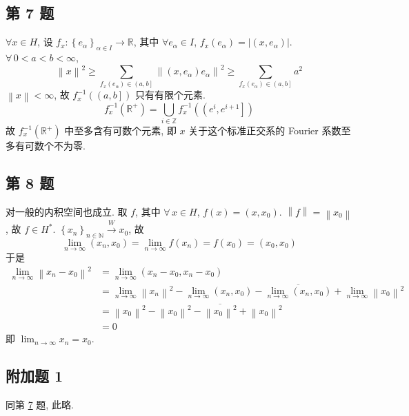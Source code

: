 \documentclass[../main.tex]{subfiles}
\begin{document}
\subsection{第 7 题}\hypertarget{question:7}{}
$\forall x \in H$, 设 $f_x : \left\{ e_\alpha \right\}_{\alpha \in I} \to \mathbb{R}$, 其中 $\forall e_\alpha \in I$, $f_x \left( e_\alpha \right) = \left| \left( x, e_\alpha \right) \right|$.
$\forall \, 0 < a < b < \infty$,
\[
    \left\| x \right\|^2
    \geqslant
    \sum_{f_x \left( e_\alpha \right) \in \left( a, b \right]} \left\| \left( x, e_\alpha \right) e_\alpha \right\|^2
    \geqslant
    \sum_{f_x \left( e_\alpha \right) \in \left( a, b \right]} a^2
\]
$\left\| x \right\| < \infty$, 故 $f_x^{-1} \left( \left( a, b \right] \right)$ 只有有限个元素.
\[
    f_x^{-1} \left( \mathbb{R}^{+} \right)
    =
    \bigcup_{i \in \mathbb{Z}} f_x^{-1} \left( \left( e^i, e^{i + 1} \right] \right)
\]
故 $f_x^{-1} \left( \mathbb{R}^{+} \right)$ 中至多含有可数个元素, 即 $x$ 关于这个标准正交系的 Fourier 系数至多有可数个不为零.

\subsection{第 8 题}
对一般的内积空间也成立.
取 $f$, 其中 $\forall \, x \in H$, $f \left( x \right) = \left( x, x_0 \right)$.
$\left\| f \right\| = \left\| x_0 \right\|$, 故 $f \in H^*$.
$\left\{ x_n \right\}_{n \in \mathbb{N}} \xrightarrow{W} x_0$,
故
\[
    \lim_{n \to \infty} \left( x_n, x_0 \right)
    =
    \lim_{n \to \infty} f \left( x_n \right)
    =
    f \left( x_0 \right)
    =
    \left( x_0, x_0 \right)
\]
于是
\begin{align*}
    \lim_{n \to \infty} \left\| x_n - x_0 \right\|^2
    &=
    \lim_{n \to \infty} \left( x_n - x_0, x_n - x_0 \right) \\
    &=
    \lim_{n \to \infty} \left\| x_n \right\|^2 - \lim_{n \to \infty} \left( x_n, x_0 \right) - \overline{\lim_{n \to \infty} \left( x_n, x_0 \right)} + \lim_{n \to \infty} \left\| x_0 \right\|^2 \\
    &= \left\| x_0 \right\|^2 - \left\| x_0 \right\|^2 - \overline{\left\| x_0 \right\|^2} + \left\| x_0 \right\|^2 \\
    &=
    0
\end{align*}
即 $\displaystyle\lim_{n \to \infty} x_n = x_0$.

\subsection{附加题 1}
同第 \hyperlink{question:7}{7} 题, 此略.
\end{document}
